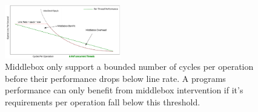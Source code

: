 \begin{figure}
    \includegraphics[width=0.45\textwidth]{fig/middlebox_model.png}

    \caption{Middlebox only support a bounded number of cycles per operation
    before their performance drops below line rate. A programs performance can
    only benefit from middlebox intervention if it's requirements per operation
    fall below this threshold.}

    \label{fig:middlebox_model}
\end{figure}









